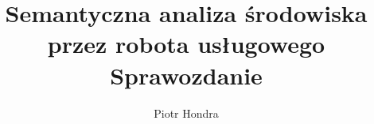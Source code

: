 \documentclass[
    bindingoffset=5mm,  %
    footnoteindent=3mm, %
    hyphenation=true    %
]{src/wut-thesis}
\begin{document}
\title{
Semantyczna analiza środowiska\\
przez robota usługowego\\ \vspace{1cm}  
Sprawozdanie
}
\author{Piotr Hondra}
\date{\the\year}
\maketitle

\clearpage
\tableofcontents

\clearpage
\pagestyle{headings}

%



\cleardoublepage %
\printbibliography

\clearpage
\pagestyle{plain}

\listoffigurestoc    %




\end{document}
